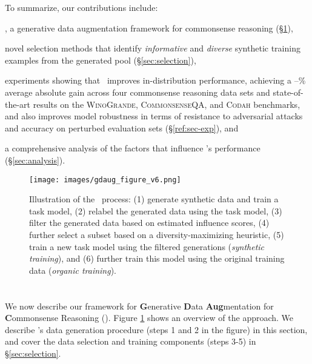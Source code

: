 \documentclass[11pt,a4paper]{article}
\newcommand{\gdaug}{}
\newcommand{\winogrande}{\textsc{WinoGrande}\xspace}
\newcommand{\codah}{\textsc{Codah}\xspace}
\newcommand{\comqa}{\textsc{CommonsenseQA}\xspace}
\begin{document}
To summarize, our contributions include: 
\begin{compactenum}
    \item \gdaug, a generative data augmentation framework for commonsense reasoning (\S\ref{sec:gdaug}), \item novel selection methods that identify \textit{informative} and \textit{diverse} synthetic training examples from the generated pool (\S\ref{sec:selection}),
    \item experiments showing that \gdaug\ improves in-distribution performance, achieving a --\% average absolute gain across four commonsense reasoning data sets and state-of-the-art results on the \winogrande \cite{sakaguchi2019winogrande}, \comqa \cite{talmor-etal-2019-commonsenseqa}, and \codah \cite{Chen2019CODAHAA} benchmarks, and also improves model robustness in terms of resistance to adversarial attacks \cite{jin2019bert} and accuracy on perturbed evaluation sets (\S\ref{ref:sec-exp}), and
    \item a comprehensive analysis of the factors that influence \gdaug's performance (\S\ref{sec:analysis}).
\end{compactenum}






\begin{figure}[t!]
\centering
  \texttt{[image: images/gdaug\_figure\_v6.png]}
  \caption{Illustration of the \gdaug\ process: (1) generate synthetic data and train a task model, (2) relabel the generated data using the task model, (3) filter the generated data based on estimated influence scores, (4) further select a subset based on a diversity-maximizing heuristic, (5) train a new task model using the filtered generations (\textit{synthetic training}), and (6) further train this model using the original training data (\textit{organic training}).}
  \label{fig:gdaug}
\end{figure} \section{\gdaug}
\label{sec:gdaug}

We now describe our framework for \textbf{G}enerative \textbf{D}ata \textbf{Aug}mentation for \textbf{C}ommonsense Reasoning (\textbf{\gdaug}).
Figure \ref{fig:gdaug} shows an overview of the approach.  We describe \gdaug 's data generation procedure (steps 1 and 2 in the figure) in this section, and cover the data selection and training components (steps 3-5) in \S\ref{sec:selection}.
\end{document}
